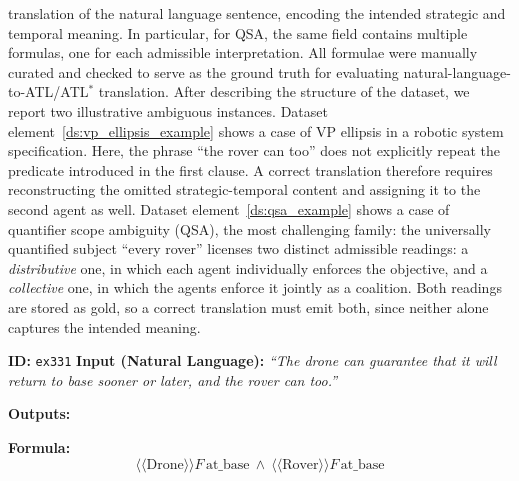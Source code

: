 translation of the natural language sentence, encoding the intended strategic and temporal meaning. In particular, for QSA, the same field contains multiple formulas, one for each admissible interpretation. All formulae were manually curated and checked to serve as the ground truth for evaluating natural-language-to-ATL/ATL$^\ast$ translation. After describing the structure of the dataset, we report two illustrative ambiguous instances. Dataset element~\ref{ds:vp_ellipsis_example} shows a case of VP ellipsis in a robotic system specification. Here, the phrase ``the rover can too'' does not explicitly repeat the predicate introduced in the first clause. A correct translation therefore requires reconstructing the omitted strategic-temporal content and assigning it to the second agent as well. Dataset element~\ref{ds:qsa_example} shows a case of quantifier scope ambiguity (QSA), the most challenging family: the universally quantified subject ``every rover'' licenses two distinct admissible readings: a \emph{distributive} one, in which each agent individually enforces the objective, and a \emph{collective} one, in which the agents enforce it jointly as a coalition. Both readings are stored as gold, so a correct translation must emit both, since neither alone captures the intended meaning.

\begin{dataset}[t]
\caption{VP ellipsis ambiguity example}
\label{ds:vp_ellipsis_example}
\begin{algorithmic}[1]
\STATE \textbf{ID:} \texttt{ex331}
\STATE \textbf{Input (Natural Language):}
\STATE \quad \textit{``The drone can guarantee that it will return to base sooner or later, and the rover can too.''}

\STATE \textbf{Outputs:}
\STATE \quad
\begin{minipage}[t]{0.92\linewidth}
\textbf{Formula:}
\[
\langle\!\langle \text{Drone} \rangle\!\rangle
F\,\text{at\_base}
\ \wedge\
\langle\!\langle \text{Rover} \rangle\!\rangle
F\,\text{at\_base}
\]
\end{minipage}
\end{algorithmic}
\end{dataset}

